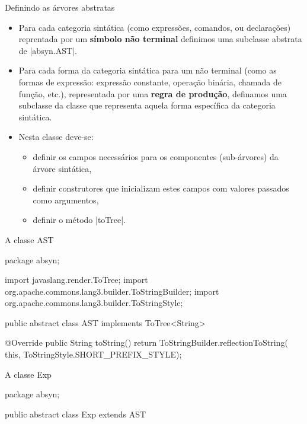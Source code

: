 \documentclass[smaller]{beamer}
\begin{document}
\begin{frame}{Definindo as árvores abstratas}
  \begin{itemize}
    \item Para cada \alert{categoria sintática} (como expressões,
    comandos, ou declarações) reprentada por um \textbf{símbolo não
      terminal} definimos uma subclasse abstrata de
    \pyginline|absyn.AST|.
    \item Para cada \alert{forma} da categoria sintática para um não
    terminal (como as formas de expressão: expressão constante,
    operação binária, chamada de função, etc.), representada por uma
    \textbf{regra de produção}, definamos uma subclasse da classe que
    representa aquela forma específica da categoria sintática.
    \item 
    Nesta classe deve-se:
    \begin{itemize}
      \item definir os \alert{campos} necessários para os componentes
      (sub-árvores) da árvore sintática,
      \item definir \alert{construtores} que inicializam estes campos
      com valores passados como argumentos,
      \item definir o método \pyginline|toTree|.
    \end{itemize}
  \end{itemize}
\end{frame}

\begin{frame}{A classe AST}
\begin{pygmented}[]
package absyn;

import javaslang.render.ToTree;
import org.apache.commons.lang3.builder.ToStringBuilder;
import org.apache.commons.lang3.builder.ToStringStyle;

public abstract class AST implements ToTree<String> {

   @Override
   public String toString() {
      return ToStringBuilder.reflectionToString(
                 this,
                 ToStringStyle.SHORT_PREFIX_STYLE);
   }

}
\end{pygmented}
\end{frame}

\begin{frame}{A classe Exp}
\begin{pygmented}[]
package absyn;

public abstract class Exp extends AST {
}
\end{pygmented}
\end{frame}
\end{document}

